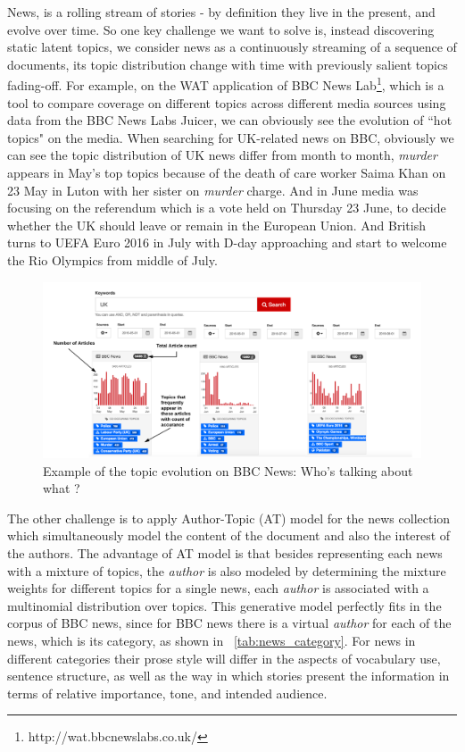 News, is a rolling stream of stories - by definition they live in the present, and evolve over time. So one key challenge we want to solve is, instead discovering static latent topics, we consider news as a continuously streaming of a sequence of documents, its topic distribution change with time with previously salient topics fading-off. For example, on the WAT application of BBC News Lab\footnote{http://wat.bbcnewslabs.co.uk/}, which is a tool to compare coverage on different topics across different media sources using data from the BBC News Labs Juicer, we can obviously see the evolution of ``hot topics" on the media. When searching for UK-related news on BBC, obviously we can see the topic distribution of UK news differ from month to month, \textit{murder} appears in May's top topics because of the death of care worker Saima Khan on 23 May in Luton with her sister on \textit{murder} charge. And in June media was focusing on the referendum which is a vote held on Thursday 23 June, to decide whether the UK should leave or remain in the European Union. And British turns to UEFA Euro 2016 in July with D-day approaching and start to welcome the Rio Olympics from middle of July.
\begin{figure}[h]
\centering
\includegraphics[width=\textwidth]{figures/BBC_wat.png}
\caption{Example of the topic evolution on BBC News: Who's talking about what ?}
\label{fig:bbc_wat}
\end{figure}

The other challenge is to apply Author-Topic (AT) model for the news collection which simultaneously model the content of the document and also the interest of the authors. The advantage of AT model is that besides representing each news with a mixture of topics, the \textit{author} is also modeled by determining the mixture weights for different topics for a single news, each \textit{author} is associated with a multinomial distribution over topics. This generative model perfectly fits in the corpus of BBC news, since for BBC news there is a virtual \textit{author} for each of the news, which is its category, as shown in ~\ref{tab:news_category}. For news in different categories their prose style will differ in the aspects of vocabulary use, sentence structure, as well as the way in which stories present the information in terms of relative importance, tone, and intended audience. 

